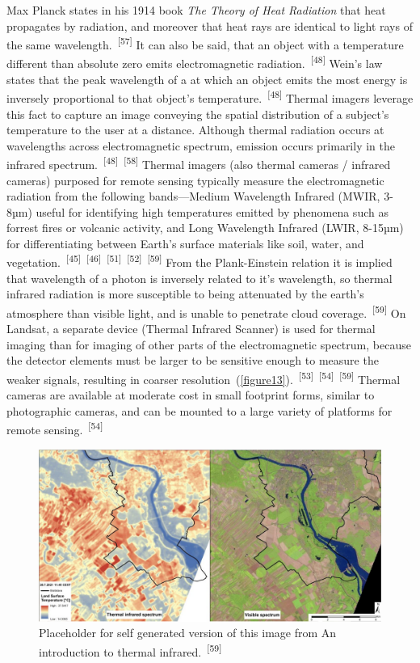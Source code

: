 \documentclass{article}
\begin{document}
\par{Max Planck states in his 1914 book \textit{The Theory of Heat Radiation} that heat propagates by radiation, and moreover that heat rays are identical to light rays of the same wavelength.~\textsuperscript{[57]} It can also be said, that an object with a temperature different than absolute zero emits electromagnetic radiation.~\textsuperscript{[48]} Wein's law states that the peak wavelength of a at which an object emits the most energy is inversely proportional to that object's temperature.~\textsuperscript{[48]} Thermal imagers leverage this fact to capture an image conveying the spatial distribution of a subject's temperature to the user at a distance. Although thermal radiation occurs at wavelengths across electromagnetic spectrum, emission occurs primarily in the infrared spectrum.~\textsuperscript{[48]}~\textsuperscript{[58]} Thermal imagers (also thermal cameras / infrared cameras) purposed for remote sensing typically measure the electromagnetic radiation from the following bands---Medium Wavelength Infrared (MWIR, 3-8µm) useful for identifying high temperatures emitted by phenomena such as forrest fires or volcanic activity, and Long Wavelength Infrared (LWIR, 8-15µm) for differentiating between Earth's surface materials like soil, water, and vegetation.~\textsuperscript{[45]}~\textsuperscript{[46]}~\textsuperscript{[51]}~\textsuperscript{[52]}~\textsuperscript{[59]} From the Plank-Einstein relation it is implied that wavelength of a photon is inversely related to it's wavelength, so thermal infrared radiation is more susceptible to being attenuated by the earth's atmosphere than visible light, and is unable to penetrate cloud coverage.~\textsuperscript{[59]} On Landsat, a separate device (Thermal Infrared Scanner) is used for thermal imaging than for imaging of other parts of the electromagnetic spectrum, because the detector elements must be larger to be sensitive enough to measure the weaker signals, resulting in coarser resolution~(\cref{figure13}).~\textsuperscript{[53]}~\textsuperscript{[54]}~\textsuperscript{[59]} Thermal cameras are available at moderate cost in small footprint forms, similar to photographic cameras, and can be mounted to a large variety of platforms for remote sensing.~\textsuperscript{[54]}}

\begin{figure}
    \centering
    \includegraphics[width=1\linewidth]{images/thermal-vs-visible.png}
    \caption{Placeholder for self generated version of this image from An introduction to thermal infrared.~\textsuperscript{[59]}}
    \label{figure15}
\end{figure}
\end{document}
